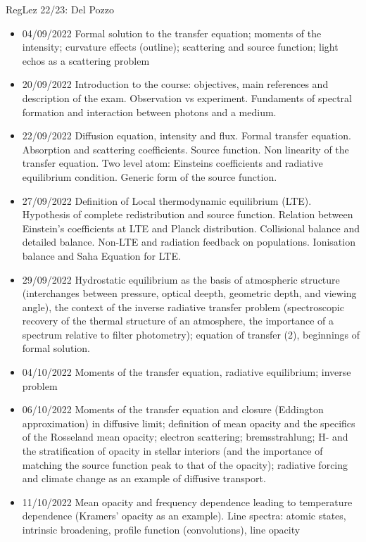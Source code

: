 \begin{wordonframe}{RegLez 22/23: Del Pozzo}
    \begin{itemize}
\item  04/09/2022 Formal solution to the transfer equation; moments of the intensity; curvature effects (outline); scattering and source function; light echos as a scattering problem 
\item 20/09/2022 Introduction to the course: objectives, main references and description of the exam. Observation vs experiment. Fundaments of spectral formation and interaction between photons and a medium. 
\item 22/09/2022 Diffusion equation, intensity and flux. Formal transfer equation. Absorption and scattering coefficients. Source function. Non linearity of the transfer equation. Two level atom: Einsteins coefficients and radiative equilibrium condition. Generic form of the source function. 
\item 27/09/2022 Definition of Local thermodynamic equilibrium (LTE). Hypothesis of complete redistribution and source function. Relation between Einstein's coefficients at LTE and Planck distribution. Collisional balance and detailed balance. Non-LTE and radiation feedback on populations. Ionisation balance and Saha Equation for LTE. 
\item 29/09/2022 Hydrostatic equilibrium as the basis of atmospheric structure (interchanges between pressure, optical deepth, geometric depth, and viewing angle), the context of the inverse radiative transfer problem (spectroscopic recovery of the thermal structure of an atmosphere, the importance of a spectrum relative to filter photometry); equation of transfer (2), beginnings of formal solution. 
\item 04/10/2022 Moments of the transfer equation, radiative equilibrium; inverse problem 
\item 06/10/2022 Moments of the transfer equation and closure (Eddington approximation) in diffusive limit; definition of mean opacity and the specifics of the Rosseland mean opacity; electron scattering; bremsstrahlung; H- and the stratification of opacity in stellar interiors (and the importance of matching the source function peak to that of the opacity); radiative forcing and climate change as an example of diffusive transport. 
\item 11/10/2022 Mean opacity and frequency dependence leading to temperature dependence (Kramers' opacity as an example). Line spectra: atomic states, intrinsic broadening, profile function (convolutions), line opacity 

\end{itemize}
\end{wordonframe}
